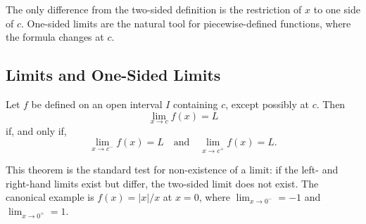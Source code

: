 \begin{remark*}
The only difference from the two-sided definition is the
restriction of $x$ to one side of $c$.
One-sided limits are the natural tool for piecewise-defined
functions, where the formula changes at $c$.
\end{remark*}

\subsection{Limits and One-Sided Limits}

\begin{tcolorbox}[colback=thmbox, colframe=thmborder, arc=2pt,
  left=6pt, right=6pt, top=4pt, bottom=4pt,
  title={\small\textbf{Theorem (Limits and One-Sided Limits)}},
  fonttitle=\small\bfseries]
Let $f$ be defined on an open interval $I$ containing $c$,
except possibly at $c$. Then
\[
  \lim_{x \to c} f(x) = L
\]
if, and only if,
\[
  \lim_{x \to c^-} f(x) = L \quad \text{and} \quad
  \lim_{x \to c^+} f(x) = L.
\]
\end{tcolorbox}

\begin{remark*}
This theorem is the standard test for non-existence of a limit:
if the left- and right-hand limits exist but differ, the
two-sided limit does not exist.
The canonical example is $f(x) = |x|/x$ at $x = 0$, where
$\lim_{x \to 0^-} = -1$ and $\lim_{x \to 0^+} = 1$.
\end{remark*}